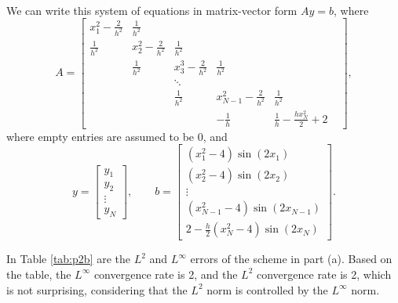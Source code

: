 \documentclass{homework}
\begin{document}
\begin{alphaparts}
\begin{align*}
		\end{align*}
		We can write this system of equations in matrix-vector form $Ay = b$, where
		\begin{equation*}
			A = \left[\begin{matrix}
				x_1^2-\frac{2}{h^2} & \frac{1}{h^2} &  &  & & \\
				\frac{1}{h^2} & x_2^2 - \frac{2}{h^2} & \frac{1}{h^2} &  &  & \\
				 & \frac{1}{h^2} & x_3^3 - \frac{2}{h^2} & \frac{1}{h^2} & &\\
			     & & \ddots &  & \\
				 &  & \frac{1}{h^2} & x_{N-1}^2 - \frac{2}{h^2} & \frac{1}{h^2} \\
				 &  &  & -\frac{1}{h} & \frac{1}{h} - \frac{hx_N^2}{2} +2
			\end{matrix}\right],
		\end{equation*}
		where empty entries are assumed to be 0, and
		\begin{equation*}
			y = \left[\begin{matrix}y_1 \\ y_2 \\ \vdots \\ y_N\end{matrix}\right], \qquad b = \left[\begin{matrix}(x_1^2 - 4)\sin(2x_1) \\[0.3em] (x_2^2-4)\sin(2x_2) \\ \vdots \\ (x_{N-1}^2-4)\sin(2x_{N-1}) \\[0.3em] 2 - \frac{h}{2}(x_N^2 - 4)\sin(2x_N)\end{matrix}\right].
		\end{equation*}
		
		\questionpart In Table \ref{tab:p2b} are the $L^2$ and $L^\infty$ errors of the scheme in part (a). Based on the table, the $L^\infty$ convergence rate is 2, and the $L^2$ convergence rate is 2, which is not surprising, considering that the $L^2$ norm is controlled by the $L^\infty$ norm.
		

\end{alphaparts}
\end{document}
